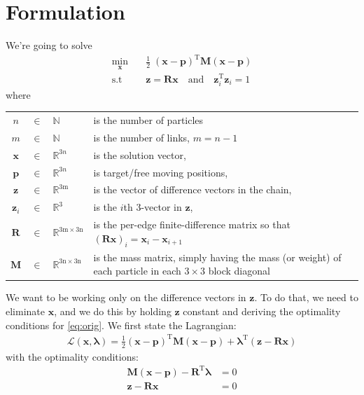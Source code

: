 \documentclass[14pt]{extarticle}
\newcommand*{\vv}[1]{\mathbf{#1}}
\newcommand{\T}{\text{T}}
\begin{document}
\section{Formulation}
We're going to solve
\begin{align}
\min_{\vv x} \quad &  \frac{1}{2} \; \vv{(x-p)}^{\T} \vv M \vv {(x-p)}
\label{eq:orig} \\
\text{s.t} \quad & \vv z = \vv R \vv x \quad \mathrm{ and} \quad \vv z_i^{\T}\vv
z_i = 1 \nonumber
\end{align}
where
\begin{center}
\renewcommand{\arraystretch}{1.3}
\begin{tabular}{@{}cclp{}@{}}
$n$ & $\in$ & $\mathbb N$ & is the number of particles \\
$m$ & $\in$ & $\mathbb N$ & is the number of links, $m = n-1$ \\
$\vv x$ & $\in$ & $\mathbb R^{3n}$ & is the solution vector, \\
$\vv p$ & $\in$ & $\mathbb R^{3n}$ & is target/free moving positions, \\
$\vv z$ & $\in$ & $\mathbb R^{\mathrm{3m}}$ & is the vector of difference vectors in the chain, \\
$\vv z_i$ & $\in$ & $\mathbb R^{\mathrm{3}}$ & is the $i$th 3-vector in $\vv z$, \\
$\vv R$ & $\in$  & $\mathbb R^{\mathrm{3m\times3n}}$ & is the per-edge
finite-difference matrix so that $(\vv R \vv x)_i = \vv x_{i} - \vv x_{i+1}$ \\
$\vv M$ & $\in$ & $\mathbb R^{\mathrm{3n\times3n}}$ & is the mass matrix, simply
having the mass (or weight) of each particle in each $3\times3$ block diagonal \\
\end{tabular}
\end{center}
We want to be working only on the difference vectors in $\vv z$. To do that, we
need to eliminate $\vv x$, and we do this by holding $\vv z$ constant and
deriving the optimality conditions for \eqref{eq:orig}. We first state the
Lagrangian:
\begin{align*}
\mathcal{L}(\vv x, \vv \lambda) = \frac{1}{2} \vv{(x-p)}^{\T} \vv M \vv{(x-p)} +
\vv \lambda^{\T} (\vv z - \vv R \vv x)
\end{align*}
with the optimality conditions:
\begin{align*}
 \vv M (\vv x - \vv p) - \vv R^{\T} \vv \lambda &= 0 \\
 \vv z - \vv R \vv x &= 0
\end{align*}
\end{document}
